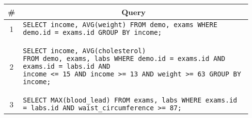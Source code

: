 \begin{tabular}{cl}
\toprule
\# & \multicolumn{1}{c}{Query} \\
\midrule
1 & \verb|SELECT income, AVG(weight) FROM demo, exams WHERE demo.id = exams.id GROUP BY income;| {queryno} \label{q1} \\
2 & 
\begin{minipage}{6in}
\begin{lstlisting}[breaklines]
SELECT income, AVG(cholesterol) 
FROM demo, exams, labs WHERE demo.id = exams.id AND exams.id = labs.id AND
income <= 15 AND income >= 13 AND weight >= 63 GROUP BY income;
\end{lstlisting}
\end{minipage}
{queryno} \label{q2} \\
3 & \verb|SELECT MAX(blood_lead) FROM exams, labs WHERE exams.id = labs.id AND waist_circumference >= 87;| {queryno} \label{q3}\\
\bottomrule
\end{tabular}

